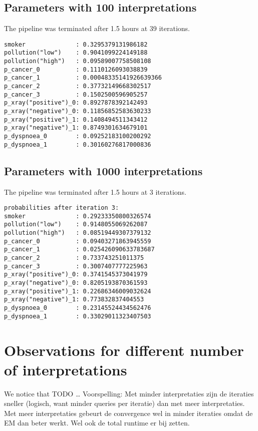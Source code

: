 \subsection{Parameters with 100 interpretations}
The pipeline was terminated after 1.5 hours at 39 iterations.
\begin{lstlisting}
smoker              : 0.3295379131986182
pollution("low")    : 0.9041099224149188
pollution("high")   : 0.09589007758508108
p_cancer_0          : 0.1110126093038839
p_cancer_1          : 0.00048335141926639366
p_cancer_2          : 0.37732149668302517
p_cancer_3          : 0.1502500596905257
p_xray("positive")_0: 0.8927878392142493
p_xray("negative")_0: 0.11856852583630233
p_xray("positive")_1: 0.1408494511343412
p_xray("negative")_1: 0.8749301634679101
p_dyspnoea_0        : 0.09252183100200292
p_dyspnoea_1        : 0.30160276817000836
\end{lstlisting}

\subsection{Parameters with 1000 interpretations}
The pipeline was terminated after 1.5 hours at 3 iterations.
\begin{lstlisting}
probabilities after iteration 3:
smoker              : 0.29233350800326574
pollution("low")    : 0.9148055069262087
pollution("high")   : 0.08519449307379132
p_cancer_0          : 0.09403271863945559
p_cancer_1          : 0.025426090633783687
p_cancer_2          : 0.733743251011375
p_cancer_3          : 0.3007407777225963
p_xray("positive")_0: 0.3741545373041979
p_xray("negative")_0: 0.8205193870361593
p_xray("positive")_1: 0.22686346009032624
p_xray("negative")_1: 0.773832837404553
p_dyspnoea_0        : 0.23145524434562476
p_dyspnoea_1        : 0.33029011323407503
\end{lstlisting}

\section{Observations for different number of interpretations}
We notice that TODO \ldots
Voorspelling: Met minder interpretaties zijn de iteraties sneller (logisch, want minder queries per iteratie) dan met meer interpretaties. Met meer interpretaties gebeurt de convergence wel in minder iteraties omdat de EM dan beter werkt. Wel ook de total runtime er bij zetten.